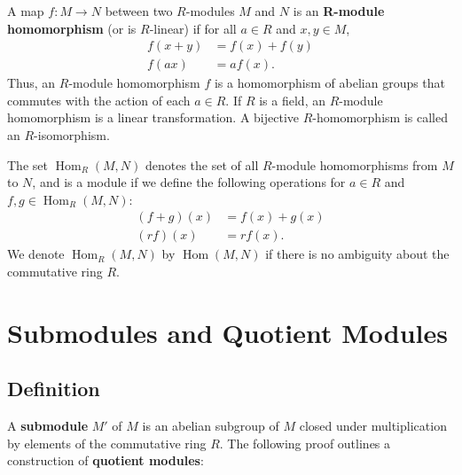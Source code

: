 \documentclass[11pt]{article}
\newcommand{\Hom}{\operatorname{Hom}}
\begin{document}
A map $f: M \to N$ between two $R$-modules $M$ and $N$ is an \textbf{R-module homomorphism} (or is $R$-linear) if for all $a \in R$ and $x, y \in M$,
\begin{align*}
	f(x + y) & = f(x) + f(y) \\
	f(ax)    & = a f(x).
\end{align*}
Thus, an $R$-module homomorphism $f$ is a homomorphism of abelian groups that commutes with the action of each $a \in R$. If $R$ is a field, an $R$-module homomorphism is a linear transformation. A bijective $R$-homomorphism is called an $R$-isomorphism.

\newpage

The set $\Hom_{R}(M, N)$ denotes the set of all $R$-module homomorphisms from $M$ to $N$, and is a module if we define the following operations for $a \in R$ and $f, g \in \Hom_{R}(M, N)$:
\begin{align*}
	(f + g)(x) & = f(x) + g(x) \\
	(rf)(x)    & = r f(x).
\end{align*}
We denote $\Hom_{R}(M, N)$ by $\Hom(M, N)$ if there is no ambiguity about the commutative ring $R$.


\section{Submodules and Quotient Modules}


\subsection{Definition}

A \textbf{submodule} $M'$ of $M$ is an abelian subgroup of $M$ closed under multiplication by elements of the commutative ring $R$. The following proof outlines a construction of \textbf{quotient modules}:
\end{document}
